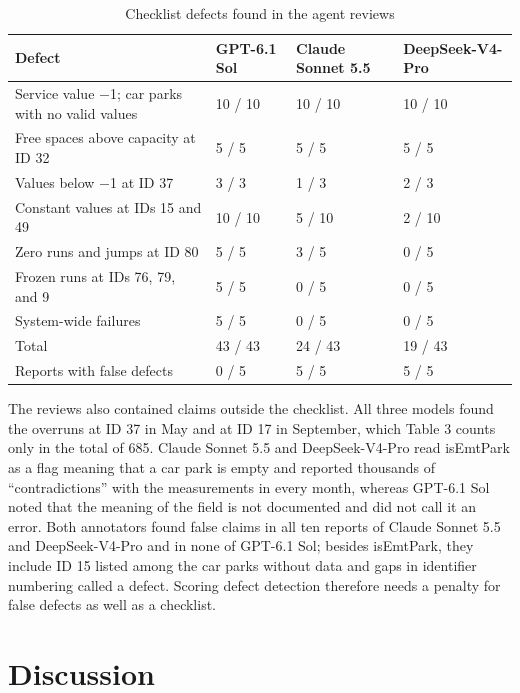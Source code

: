 \documentclass[default]{subfiles}
\begin{document}
{\begin{table}[htbp]
  \caption{Checklist defects found in the agent reviews}
  \label{tab:12}
  \centering\small
  \begin{tabular}{p{}p{}p{}p{}}
    \hline
    \textbf{Defect} & \textbf{GPT-6.1 Sol} & \textbf{Claude Sonnet 5.5} & \textbf{DeepSeek-V4-Pro} \\ \hline
    Service value $-$1; car parks with no valid values & 10 / 10 & 10 / 10 & 10 / 10 \\
    Free spaces above capacity at ID 32 & 5 / 5 & 5 / 5 & 5 / 5 \\
    Values below $-$1 at ID 37 & 3 / 3 & 1 / 3 & 2 / 3 \\
    Constant values at IDs 15 and 49 & 10 / 10 & 5 / 10 & 2 / 10 \\
    Zero runs and jumps at ID 80 & 5 / 5 & 3 / 5 & 0 / 5 \\
    Frozen runs at IDs 76, 79, and 9 & 5 / 5 & 0 / 5 & 0 / 5 \\
    System-wide failures & 5 / 5 & 0 / 5 & 0 / 5 \\
    Total & 43 / 43 & 24 / 43 & 19 / 43 \\
    Reports with false defects & 0 / 5 & 5 / 5 & 5 / 5 \\
    \hline
  \end{tabular}
\end{table}

The reviews also contained claims outside the checklist. All three models found the overruns at ID 37 in May and at ID 17 in September, which Table 3 counts only in the total of 685. Claude Sonnet 5.5 and DeepSeek-V4-Pro read isEmtPark as a flag meaning that a car park is empty and reported thousands of ``contradictions'' with the measurements in every month, whereas GPT-6.1 Sol noted that the meaning of the field is not documented and did not call it an error. Both annotators found false claims in all ten reports of Claude Sonnet 5.5 and DeepSeek-V4-Pro and in none of GPT-6.1 Sol; besides isEmtPark, they include ID 15 listed among the car parks without data and gaps in identifier numbering called a defect. Scoring defect detection therefore needs a penalty for false defects as well as a checklist.

\section{Discussion}

}
\end{document}
